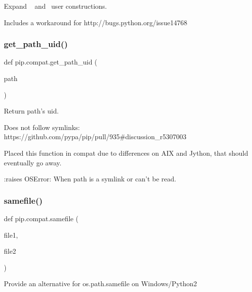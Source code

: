 \begin{DoxyVerb}Expand ~ and ~user constructions.

Includes a workaround for http://bugs.python.org/issue14768
\end{DoxyVerb}
 \mbox{\label{namespacepip_1_1compat_a1239985da93ed3cf6f017c0d234c1bd2}} 
\subsubsection{\texorpdfstring{get\+\_\+path\+\_\+uid()}{get\_path\_uid()}}
{\footnotesize\ttfamily def pip.\+compat.\+get\+\_\+path\+\_\+uid (\begin{DoxyParamCaption}\item[{}]{path }\end{DoxyParamCaption})}

\begin{DoxyVerb}Return path's uid.

Does not follow symlinks:
    https://github.com/pypa/pip/pull/935#discussion_r5307003

Placed this function in compat due to differences on AIX and
Jython, that should eventually go away.

:raises OSError: When path is a symlink or can't be read.
\end{DoxyVerb}
 \mbox{\label{namespacepip_1_1compat_a73d4f009414127d4821c2ce3f7c362ae}} 
\subsubsection{\texorpdfstring{samefile()}{samefile()}}
{\footnotesize\ttfamily def pip.\+compat.\+samefile (\begin{DoxyParamCaption}\item[{}]{file1,  }\item[{}]{file2 }\end{DoxyParamCaption})}

\begin{DoxyVerb}Provide an alternative for os.path.samefile on Windows/Python2\end{DoxyVerb}
 

